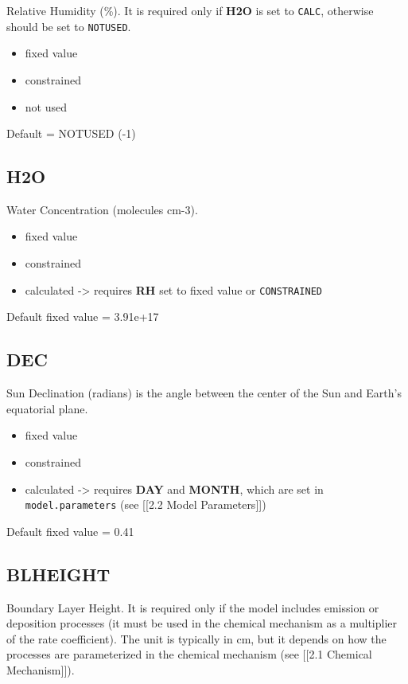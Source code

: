 Relative Humidity (\%). It is required only if \textbf{H2O} is set to
\texttt{CALC}, otherwise should be set to \texttt{NOTUSED}.

\begin{itemize}
\item
  fixed value
\item
  constrained
\item
  not used
\end{itemize}

Default = NOTUSED (-1)

\hypertarget{h2o}{%
\subsection{H2O}\label{h2o}}

Water Concentration (molecules cm-3).

\begin{itemize}
\item
  fixed value
\item
  constrained
\item
  calculated -\textgreater{} requires \textbf{RH} set to fixed value or
  \texttt{CONSTRAINED}
\end{itemize}

Default fixed value = 3.91e+17

\hypertarget{dec}{%
\subsection{DEC}\label{dec}}

Sun Declination (radians) is the angle between the center of the Sun and
Earth's equatorial plane.

\begin{itemize}
\item
  fixed value
\item
  constrained
\item
  calculated -\textgreater{} requires \textbf{DAY} and \textbf{MONTH},
  which are set in \texttt{model.parameters} (see {[}{[}2.2 Model
  Parameters{]}{]})
\end{itemize}

Default fixed value = 0.41

\hypertarget{blheight}{%
\subsection{BLHEIGHT}\label{blheight}}

Boundary Layer Height. It is required only if the model includes
emission or deposition processes (it must be used in the chemical
mechanism as a multiplier of the rate coefficient). The unit is
typically in cm, but it depends on how the processes are parameterized
in the chemical mechanism (see {[}{[}2.1 Chemical Mechanism{]}{]}).

